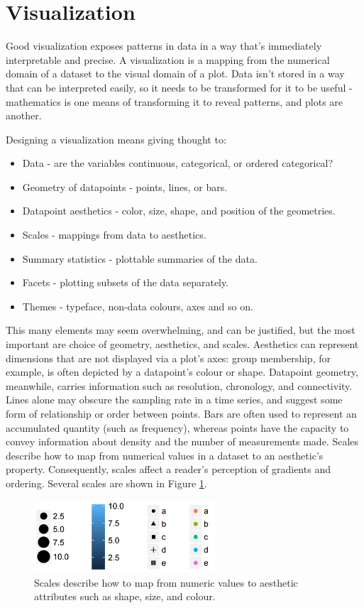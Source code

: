 \documentclass[11pt,a4paper,article]{memoir} %
\begin{document}
\newpage
\section{Visualization}
\label{suggested_vis}
Good visualization exposes patterns in data in a way that's immediately interpretable and precise. A visualization is a mapping from the numerical domain of a dataset to the visual domain of a plot. Data isn't stored in a way that can be interpreted easily, so it needs to be transformed for it to be useful - mathematics is one means of transforming it to reveal patterns, and plots are another.

Designing a visualization means giving thought to:
\begin{itemize}
\item Data - are the variables continuous, categorical, or ordered categorical?
\item Geometry of datapoints - points, lines, or bars.
\item Datapoint aesthetics - color, size, shape, and position of the geometries.
\item Scales - mappings from data to aesthetics.
\item Summary statistics - plottable summaries of the data.
\item Facets - plotting subsets of the data separately.
\item Themes - typeface, non-data colours, axes and so on.
\end{itemize}
This many elements may seem overwhelming, and can be justified, but the most important are choice of geometry, aesthetics, and scales. Aesthetics can represent dimensions that are not displayed via a plot's axes: group membership, for example, is often depicted by a datapoint's colour or shape. Datapoint geometry, meanwhile, carries information such as resolution, chronology, and connectivity. Lines alone may obscure the sampling rate in a time series, and suggest some form of relationship or order between points. Bars are often used to represent an accumulated quantity (such as frequency), whereas points have the capacity to convey information about density and the number of measurements made. Scales describe how to map from numerical values in a dataset to an aesthetic's property. Consequently, scales affect a reader's perception of gradients and ordering. Several scales are shown in Figure \ref{fig:scales}.
\begin{figure}[h!]
\centering
\includegraphics[width=0.6\textwidth]{scales.png}
\caption{Scales describe how to map from numeric values to aesthetic attributes such as shape, size, and colour.}
\label{fig:scales}
\end{figure}
\vspace{-14pt}
\end{document}

